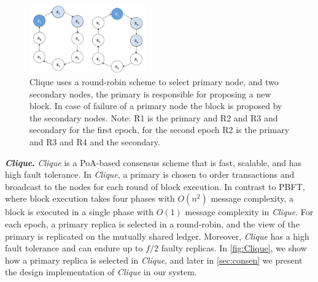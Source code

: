 \documentclass[5p]{elsarticle}
\newcommand{\BfPara}[1]{{\noindent\bf#1.}\xspace}
\newcommand{\rc}{{{\em RouteChain}}\xspace}
\begin{document}



\begin{figure}[t]
\centering
\includegraphics[width=0.45\textwidth]{fig/bgp_clique_roundrobin.pdf}
\caption{Clique uses a round-robin scheme to select primary node, and two secondary nodes, the primary is responsible for proposing a new block. In case of failure of a primary node the block is proposed by the secondary nodes. Note: R1 is the primary and R2 and R3 and secondary for the first epoch, for the second epoch R2 is the primary and R3 and R4 and the secondary. }
\label{fig:Clique}
\end{figure}


\BfPara{{\em Clique}} \label{sec:cq}
{\em Clique} is a PoA-based consensus scheme that is fast, scalable, and has high fault tolerance. In {\em Clique}, a primary is chosen to order transactions and broadcast to the nodes for each round of block execution. In contrast to PBFT, where block execution takes four phases with $O(n^2)$ message complexity, a block is executed in a single phase with $O(1)$ message complexity in {\em Clique}. For each epoch, a primary replica is selected in a round-robin, and the view of the primary is replicated on the mutually shared ledger. Moreover, {\em Clique} has a high fault tolerance and can endure up to $f/2$ faulty replicas. In \autoref{fig:Clique}, we show how a primary replica is selected in {\em Clique}, and later in \textsection\ref{sec:consen} we present the design implementation of {\em Clique} in our system. 
\end{document}
